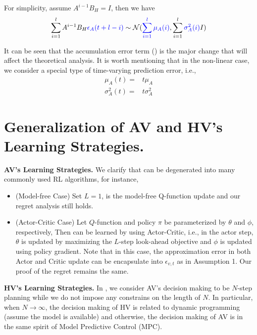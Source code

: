 For simplicity, assume $A^{i-1}B_H = I$, then we have
\begin{align}
      \sum_{i=1}^{l}A^{i-1}B_H {\color{blue}\epsilon_A(t+l-i)} \sim \mathcal{N} ( {\color{blue}\sum_{i=1}^l\mu_A(i)}, \sum_{i=1}^l  {\color{blue}\sigma_A^2(i)} I ) \label{eqn:app:accumulation2}
\end{align}

It can be seen that the accumulation error term  () is the major change that will affect the theoretical analysis. It is worth mentioning that in the non-linear case, we consider a special type of time-varying prediction error, i.e., 
\begin{align}
    \mu_A(t) =& t\mu_A \\
    \sigma_A^2(t) =& t\sigma_A^2
\end{align}




\section{Generalization of AV and HV's Learning Strategies.}\label{app:general}
{
{\bf AV's Learning Strategies.} We clarify that  can be degenerated into many commonly used RL algorithms, for instance,
    \begin{itemize}
        \item (Model-free Case) Set $L=1$,   is the model-free Q-function update and our regret analysis still holds. 
        \item (Actor-Critic Case) Let $Q$-function and policy $\pi$ be parameterized by $\theta$ and $\phi$, respectively, Then   can be learned by using Actor-Critic, i.e., in the actor step,  $\theta$ is updated by maximizing the $L$-step look-ahead objective and $\phi$ is updated using policy gradient. Note that in this case, the approximation error in both Actor and Critic update can be encapsulate into $\epsilon_{v,t}$ as in Assumption 1.  Our proof of the regret remains the same.
    \end{itemize}

{\bf HV's Learning Strategies.} In , we consider AV's decision making to be $N$-step planning while we do not impose any constrains on the length of $N$. In particular, when $N\to \infty$, the decision making of HV is related to dynamic programming (assume the model is available) and otherwise, the decision making of AV is in the same spirit of Model Predictive Control (MPC). 

}


